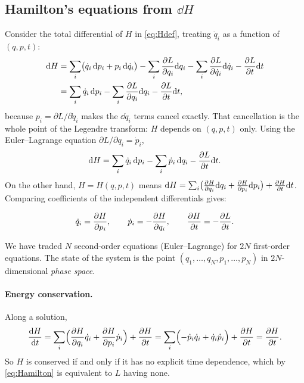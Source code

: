 \documentclass[11pt]{article}
\begin{document}
\subsection{\texorpdfstring{Hamilton's equations from $\dd H$}{Hamilton's equations from dH}}

Consider the total differential of $H$ in \eqref{eq:Hdef}, treating $\dot q_i$ as a function of $(q,p,t)$:
\begin{align}
 \mathrm{d} H &= \sum_i\bigl(\dot q_i\,\mathrm{d} p_i + p_i\,\mathrm{d}\dot q_i\bigr) - \sum_i\frac{\partial L}{\partial q_i}\mathrm{d} q_i-\sum_i\frac{\partial L}{\partial \dot q_i}\mathrm{d}\dot q_i - \frac{\partial L}{\partial t}\mathrm{d} t \nonumber\\
 &= \sum_i\dot q_i\,\mathrm{d} p_i - \sum_i\frac{\partial L}{\partial q_i}\mathrm{d} q_i - \frac{\partial L}{\partial t}\mathrm{d} t ,
\end{align}
because $p_i=\partial L/\partial\dot q_i$ makes the $\dd\dot q_i$ terms cancel exactly. That cancellation is the whole point of the Legendre transform: $H$ depends on $(q,p,t)$ only. Using the Euler--Lagrange equation $\partial L/\partial q_i=\dot p_i$,
\begin{equation}
 \mathrm{d} H = \sum_i \dot q_i\,\mathrm{d} p_i - \sum_i\dot p_i\,\mathrm{d} q_i - \frac{\partial L}{\partial t}\mathrm{d} t .
\end{equation}
On the other hand, $H=H(q,p,t)$ means $\mathrm{d} H=\sum_i\bigl(\frac{\partial H}{\partial q_i}\mathrm{d} q_i+\frac{\partial H}{\partial p_i}\mathrm{d} p_i\bigr)+\frac{\partial H}{\partial t}\mathrm{d} t$. Comparing coefficients of the independent differentials gives:

\begin{keyresult}
\begin{equation}
 \dot q_i=\frac{\partial H}{\partial p_i},\qquad \dot p_i=-\frac{\partial H}{\partial q_i},\qquad \frac{\partial H}{\partial t}=-\frac{\partial L}{\partial t} .
\label{eq:Hamilton}
\end{equation}
\end{keyresult}

We have traded $N$ second-order equations (Euler--Lagrange) for $2N$ first-order equations. The state of the system is the point $(q_1,\dots,q_N,p_1,\dots,p_N)$ in $2N$-dimensional \emph{phase space}.

\paragraph{Energy conservation.} Along a solution,
\begin{equation}
 \frac{\mathrm{d} H}{\mathrm{d} t}=\sum_i\Bigl(\frac{\partial H}{\partial q_i}\dot q_i+\frac{\partial H}{\partial p_i}\dot p_i\Bigr)+\frac{\partial H}{\partial t}
 =\sum_i\Bigl(-\dot p_i\dot q_i+\dot q_i\dot p_i\Bigr)+\frac{\partial H}{\partial t}=\frac{\partial H}{\partial t} .
\end{equation}
So $H$ is conserved if and only if it has no explicit time dependence, which by \eqref{eq:Hamilton} is equivalent to $L$ having none.
\end{document}

